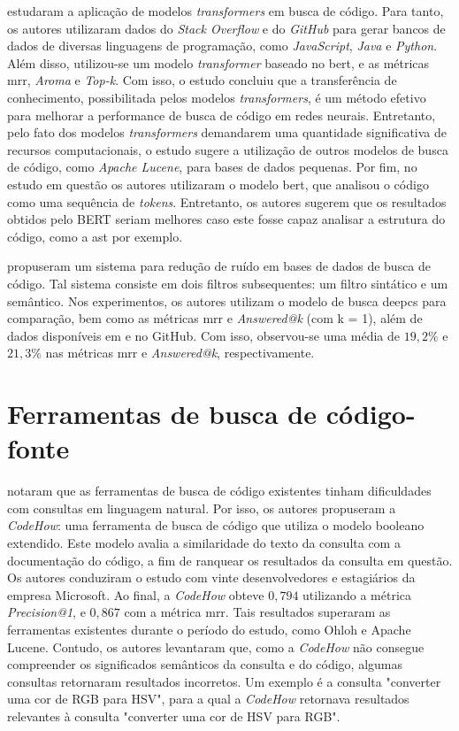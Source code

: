 \textcite{Salza2021OnTE} estudaram a aplicação de modelos \textit{transformers} em busca de código. Para tanto, os autores utilizaram dados do \textit{Stack Overflow} e do \textit{GitHub} para gerar bancos de dados de diversas linguagens de programação, como \textit{JavaScript}, \textit{Java} e \textit{Python}. Além disso, utilizou-se um modelo \textit{transformer} baseado no \gls{bert}, e as métricas \gls{mrr}, \textit{Aroma} e \textit{Top-k}. Com isso, o estudo concluiu que a transferência de conhecimento, possibilitada pelos modelos \textit{transformers}, é um método efetivo para melhorar a performance de busca de código em redes neurais. Entretanto, pelo fato dos modelos \textit{transformers} demandarem uma quantidade significativa de recursos computacionais, o estudo sugere a utilização de outros modelos de busca de código, como \textit{Apache Lucene}, para bases de dados pequenas. Por fim, no estudo em questão os autores utilizaram o modelo \gls{bert}, que analisou o código como uma sequência de \textit{tokens}. Entretanto, os autores sugerem que os resultados obtidos pelo BERT seriam melhores caso este fosse capaz analisar a estrutura do código, como a \gls{ast} por exemplo.

\textcite{Sun2022OnTI} propuseram um sistema para redução de ruído em bases de dados de busca de código. Tal sistema consiste em dois filtros subsequentes: um filtro sintático e um semântico. Nos experimentos, os autores utilizam o modelo de busca \gls{deepcs} para comparação, bem como as métricas \gls{mrr} e \textit{Answered@k} (com k = 1), além de dados disponíveis em \cite{Husain2019CodeSearchNetCE} e no GitHub. Com isso, observou-se uma média de $19,2\%$ e $21,3\%$ nas métricas \gls{mrr} e \textit{Answered@k}, respectivamente.

\section{Ferramentas de busca de código-fonte}

\textcite{lv2015codehow} notaram que as ferramentas de busca de código existentes tinham dificuldades com consultas em linguagem natural. Por isso, os autores propuseram a \textit{CodeHow}: uma ferramenta de busca de código que utiliza o modelo booleano extendido. Este modelo avalia a similaridade do texto da consulta com a documentação do código, a fim de ranquear os resultados da consulta em questão. Os autores conduziram o estudo com vinte desenvolvedores e estagiários da empresa Microsoft. Ao final, a \textit{CodeHow} obteve $0,794$ utilizando a métrica \textit{Precision@1}, e $0,867$ com a métrica \gls{mrr}. Tais resultados superaram as ferramentas existentes durante o período do estudo, como Ohloh e Apache Lucene. Contudo, os autores levantaram que, como a \textit{CodeHow} não consegue compreender os significados semânticos da consulta e do código, algumas consultas retornaram resultados incorretos. Um exemplo é a consulta "converter uma cor de RGB para HSV", para a qual a \textit{CodeHow} retornava resultados relevantes à consulta "converter uma cor de HSV para RGB".

